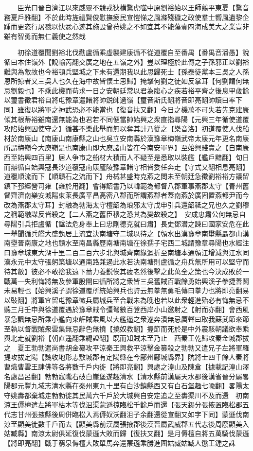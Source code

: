 　　臣光曰晉自濟江以來威靈不競戎狄横騖虎噬中原劉裕始以王師翦平東夏【騖音務夏戶雅翻】不於此時旌禮賢俊慰撫疲民宣愷悌之風滌殘穢之政使羣士嚮風遺黎企踵而更恣行屠戮以快忿心迹其施設曾苻姚之不如宜其不能蕩壹四海成美大之業豈非雖有智勇而無仁義使之然哉

　　初徐道覆聞劉裕北伐勸盧循乘虛襲建康循不從道覆自至番禺【番禺音潘愚】說循曰本住嶺外【說輸芮翻交廣之地在五嶺之外】豈以理極於此傳之子孫邪正以劉裕難與為敵故也今裕頓兵堅城之下未有還期我以此思歸死士【孫泰徒黨本三吳之人孫恩所掠者又三吳人也久在海中故皆懷土思歸】掩擊何劉之徒如反掌耳【何劉謂何無忌劉毅也】不乘此機而苟求一日之安朝廷常以君為腹心之疾若裕平齊之後息甲歲餘以璽書徵君裕自將屯豫章遣諸將帥鋭師過嶺【璽音斯氏翻將音即亮翻帥讀曰率下同】雖復以將軍之神武恐必不能當也【復音扶又翻】今日之機萬不可失若先克建康傾其根蒂裕雖南還無能為也君若不同便當帥始興之衆直指尋陽【元興三年循使道覆攻陷始興因使守之】循甚不樂此舉而無以奪其計乃從之【樂音洛】初道覆使人伐船材於南康山【南康山南康縣之山也吳立安南縣於漢豫章梅嶺武帝太康元年更名南康所謂梅嶺今大庾嶺是也南康山即大庾諸山皆在今南安軍界】至始興賤賣之【自南康西至始興四百里】居人争市之船材大積而人不疑至是悉取以裝艦【艦戶黯翻】旬日而辦循自始興寇長沙道覆寇南康廬陵豫章諸守相皆委任奔走【守式又翻相息亮翻】道覆順流而下【順贑石之流而下】舟械甚盛時克燕之問未至朝廷急徵劉裕裕方議留鎮下邳經營司雍【雍於用翻】會得詔書乃以韓範為都督八郡軍事燕郡太守【青州舊督齊濟南樂安城陽東莱長廣平昌高密八郡而所謂燕郡者蓋南燕於廣固置燕都尹而今改為燕郡太守耳】封融為勃海太守檀韶為琅邪太守戊申引兵還韶祗之兄也久之劉穆之稱範融謀反皆殺之【二人燕之舊臣穆之恐其為變故殺之】　安成忠肅公何無忌自尋陽引兵拒盧循【諡法危身奉上曰忠剛德克就曰肅】長史鄧潜之諫曰國家安危在此一舉聞循兵艦大盛埶居上流宜決南塘守二城以待之【贑水出漢豫章南壄縣聶都山漢南壄晉南康之地也贑水至南昌縣歷南塘南塘在徐孺子宅西二城謂豫章尋陽也水經注曰豫章城東大湖十里二百二百六步北與城齊南緣迴折至南塘本通贑江增減與江水同漢永元中太守張躬築塘以通南路兼遏此水若決南塘則盧循之舟兵無所用可以堅守而待其敝】彼必不敢捨我遠下蓄力養鋭俟其疲老然後擊之此萬全之策也今決成敗於一戰萬一失利悔將無及參軍殷闡曰循所將之衆皆三吳舊賊百戰餘勇始興溪子拳捷善鬭未易輕也【始興溪子謂徐道覆所統始興兵也詩云無拳無勇毛傳曰拳力也將即亮翻易以䜴翻】將軍宜留屯豫章徵兵屬城兵至合戰未為晚也若以此衆輕進殆必有悔無忌不聽三月壬申與徐道覆遇於豫章賊令彊弩數百登西岸小山邀射之【射而亦翻】會西風暴急飄無忌所乘小艦向東㟁賊乘風以大艦逼之衆遂奔潰無忌厲聲曰取我蘇武節來節至執以督戰賊衆雲集無忌辭色無撓【撓奴教翻】握節而死於是中外震駭朝議欲奉乘輿北走就劉裕【朝直遥翻乘繩證翻】既而知賊未至乃止　西秦王乾歸攻秦金城郡拔之　夏王勃勃遣尚書胡金纂攻平涼秦王興救平涼擊金纂殺之勃勃又遣兄子左將軍羅提攻拔定陽【魏收地形志敷城郡有定陽縣在今鄜州鄜城縣界】阬將士四千餘人秦將曹熾曹雲王肆佛等各將數千戶内徙【將即亮翻】興處之湟山及陳倉【據載記湟山澤名處昌呂翻】勃勃寇隴右破白崖堡遂趣清水【清水縣前漢屬天水郡後漢省晉分屬畧陽郡元豐九域志清水縣在秦州東九十里有白沙鎮縣西又有白石堡趣七喩翻】畧陽太守姚夀都棄城走勃勃徙其民萬六千戶於大城興自安定追之至夀渠川不及而還　初南涼王傉檀遣左將軍枯木等伐沮渠蒙遜掠臨松千餘戶而還【張天錫分張掖置臨松郡五代志甘州張掖縣後周併臨松入焉傉奴沃翻沮子余翻還從宣翻又如字下同】蒙遜伐南涼至顯美徙數千戶而去【顯美縣前漢屬張掖郡後漢晉屬武威郡五代志後周廢顯美入姑臧縣】南涼太尉俱延復伐蒙遜大敗而歸【復扶又翻】是月傉檀自將五萬騎伐蒙遜【將即亮翻】戰于窮泉傉檀大敗單馬奔還蒙遜乘勝進圍姑臧姑臧人懲王鍾之誅